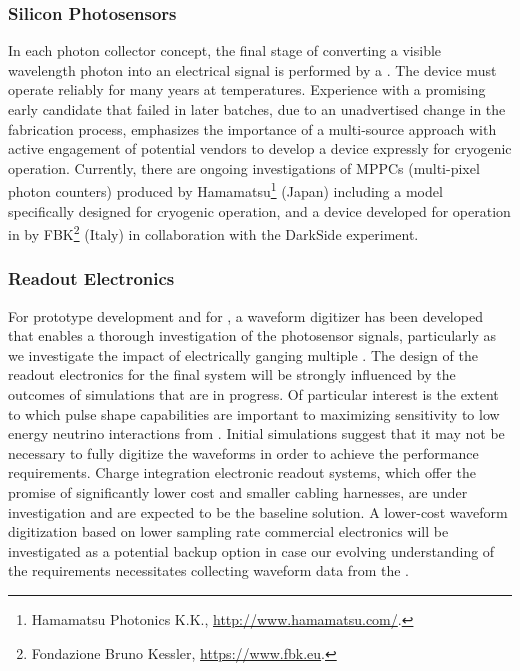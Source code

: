 \subsubsection{Silicon Photosensors} 
In each photon collector concept, the final stage of converting a visible wavelength photon into an electrical signal is performed by a . The device must operate reliably for many years at \lar temperatures.
Experience with a promising early candidate that failed in later batches, due to an unadvertised change in the fabrication process, emphasizes the importance of a multi-source approach with active engagement of potential vendors to develop a device expressly for cryogenic operation. Currently, there are ongoing investigations of MPPCs (multi-pixel photon counters) produced by Hamamatsu\footnote{Hamamatsu\texttrademark{} Photonics K.K., \url{http://www.hamamatsu.com/}.} (Japan) including a model specifically designed for cryogenic operation, and a device developed for operation in \lar by FBK\footnote{Fondazione Bruno Kessler\texttrademark{}, \url{https://www.fbk.eu}.} (Italy) in collaboration with the DarkSide experiment.

\subsubsection{Readout Electronics} 
For prototype development and for , a waveform digitizer has been developed that enables a thorough investigation of the photosensor signals, particularly as we investigate the impact of electrically ganging multiple . The design of the readout electronics for the final system will be strongly influenced by the outcomes of  simulations that are in progress. Of particular interest is the extent to which pulse  shape capabilities are important to maximizing sensitivity to low energy neutrino interactions from . 
Initial  simulations suggest that it may not be necessary to fully digitize the  waveforms in order to achieve the  performance requirements.  Charge integration electronic readout systems, which offer the promise of significantly lower cost and smaller cabling harnesses, are under investigation and are expected to be the baseline solution.
A lower-cost waveform digitization based on lower sampling rate commercial electronics will be investigated as a potential backup option in case our evolving understanding of the requirements necessitates collecting waveform data from the .

